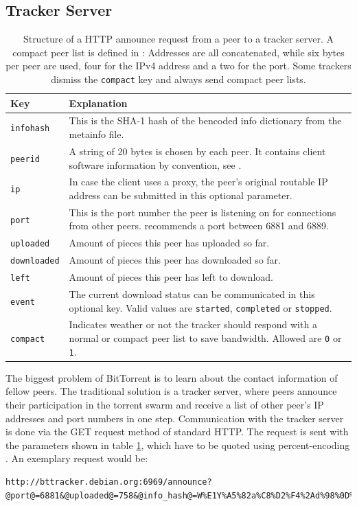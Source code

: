 \documentclass[10pt, a4paper, twoside=false, headsepline]{scrbook}
\renewcommand{\_}{\origunderscore\allowbreak}
\begin{document}
\subsection{Tracker Server}
\label{tracker-server}
\begin{table}
\centering
\begin{tabularx}{\textwidth}{lX}
\toprule
Key & Explanation \\
\midrule
\texttt{info\_hash} & This is the SHA-1 hash of the bencoded info dictionary from the metainfo file. \\
\texttt{peer\_id} & A string of 20 bytes is chosen by each peer. It contains client software information by convention, see \cite{bep20}. \\
\texttt{ip} & In case the client uses a proxy, the peer's original routable IP address can be submitted in this optional parameter. \\
\texttt{port} & This is the port number the peer is listening on for connections from other peers. \cite{bep3} recommends a port between 6881 and 6889. \\
\texttt{uploaded} & Amount of pieces this peer has uploaded so far. \\
\texttt{downloaded} & Amount of pieces this peer has downloaded so far. \\
\texttt{left} & Amount of pieces this peer has left to download. \\
\texttt{event} & The current download status can be communicated in this optional key. Valid values are \texttt{started}, \texttt{completed} or \texttt{stopped}. \\
\texttt{compact} & Indicates weather or not the tracker should respond with a normal or compact peer list to save bandwidth. Allowed are \texttt{0} or \texttt{1}. \\
\bottomrule
\end{tabularx}
\caption[Structure of a HTTP announce request]{Structure of a HTTP announce request from a peer to a tracker server. A compact peer list is defined in \cite{bep23}: Addresses are all concatenated, while six bytes per peer are used, four for the IPv4 address and a two for the port. Some trackers dismiss the \texttt{compact} key and always send compact peer lists.}
\label{announce}
\end{table}

The biggest problem of BitTorrent is to learn about the contact information of fellow peers. The traditional solution is a tracker server, where peers announce their participation in the torrent swarm and receive a list of other peer's IP addresses and port numbers in one step. Communication with the tracker server is done via the GET request method of standard HTTP. The request is sent with the parameters shown in table \ref{announce}, which have to be quoted using percent-encoding \cite[§~2.1]{percent}. An exemplary request would be:
\begin{lstlisting}
http://bttracker.debian.org:6969/announce?@port@=6881&@uploaded@=758&@info_hash@=W%E1Y%A5%82a%C8%D2%F4%2Ad%98%0D%2B%80%8E9%01%FC%F6&@peer_id@=hNsfr5PYlFtWO73yvSGX&@compact@=1&@event@=started&@left@=1896&@downloaded@=1896
\end{lstlisting}
\end{document}
